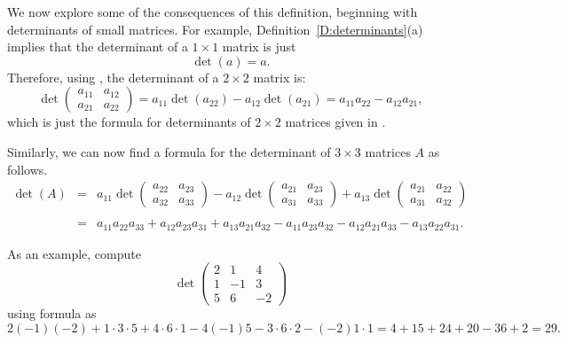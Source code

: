We now explore some of the consequences of this definition, beginning 
with determinants of small matrices.  For example, 
Definition~\ref{D:determinants}(a) implies that the determinant of a 
$1\times 1$ matrix is just
\[
\det(a) = a.
\]
Therefore, using , the determinant of a $2\times
2$ matrix is:
\[
\det\left(\begin{array}{cc} a_{11} & a_{12}\\a_{21} & a_{22}
\end{array}\right) = a_{11}\det(a_{22}) - a_{12}\det(a_{21}) =
a_{11}a_{22} - a_{12}a_{21},
\]
which is just the formula for determinants of $2\times 2$
matrices given in . 
 
Similarly, we can now find a formula for the determinant of
$3\times 3$ matrices $A$ as follows.
\begin{eqnarray} 
\det(A) & = & a_{11}
\det \left(\begin{array}{cc} a_{22} & a_{23}\\a_{32} & a_{33}
\end{array}\right) 
- a_{12}
\det \left(\begin{array}{cc} a_{21} & a_{23}\\a_{31} & a_{33}
\end{array}\right) 
+ a_{13}
\det\left(\begin{array}{cc} a_{21} & a_{22}\\a_{31} & a_{32}
\end{array}\right) \nonumber \\
 & & \label{e:det3} \\
& = & a_{11}a_{22}a_{33} + a_{12}a_{23}a_{31} + a_{13}a_{21}a_{32}
- a_{11}a_{23}a_{32} - a_{12}a_{21}a_{33} - a_{13}a_{22}a_{31}. \nonumber
\end{eqnarray}  

As an example, compute
\[
\det\left(\begin{array}{rrr} 2 & 1 & 4\\ 1 & -1 & 3\\ 5 & 6 & -2
\end{array}\right) 
\]
using formula  as
\[
2(-1)(-2) + 1\cdot3\cdot5 + 4\cdot6\cdot1 -4(-1)5 -3\cdot6\cdot2
- (-2)1\cdot1  = 4+15+24+20 -36 +2 = 29. 
\]

